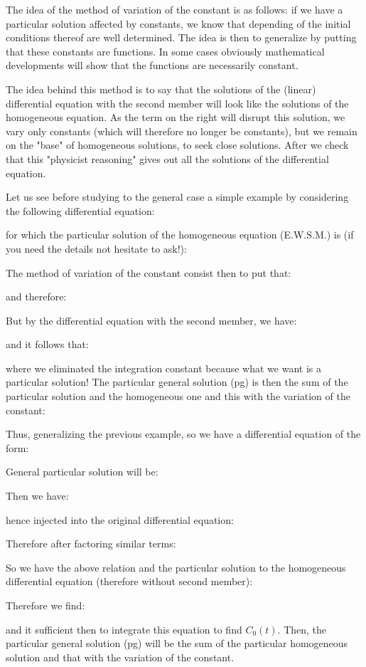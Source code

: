 	The idea of the method of variation of the constant is as follows: if we have a particular solution affected by constants, we know that depending of the initial conditions thereof are well determined. The idea is then to generalize by putting that these constants are functions. In some cases obviously mathematical developments will show that the functions are necessarily constant.
	
	The idea behind this method is to say that the solutions of the (linear) differential equation with the second member will look like the solutions of the homogeneous equation. As the term on the right will disrupt this solution, we vary only constants (which will therefore no longer be constants), but we remain on the "base" of homogeneous solutions, to seek close solutions. After we check that this "physicist reasoning" gives out all the solutions of the differential equation.
	
	Let us see before studying to the general case a simple example by considering the following differential equation:
	
	for which the particular solution of the homogeneous equation (E.W.S.M.) is (if you need the details not hesitate to ask!):
	
	The method of variation of the constant consist then to put that:
	
	and therefore:
	
	But by the differential equation with the second member, we have:
	
	
	and it follows that:
	
	where we eliminated the integration constant because what we want is a particular solution! The particular general solution (pg) is then the sum of the particular solution and the homogeneous one and this with the variation of the constant:
	
	Thus, generalizing the previous example, so we have a differential equation of the form:
	
	General particular solution will be:
	
	Then we have:
	
	hence injected into the original differential equation:
	
	Therefore after factoring similar terms:
	
	So we have the above relation and the particular solution to the homogeneous differential equation (therefore without second member):
	
	Therefore we find:
	
	and it sufficient then to integrate this equation to find $C_0(t)$. Then, the particular general solution (pg) will be the sum of the particular homogeneous solution and that with the variation of the constant.
	
